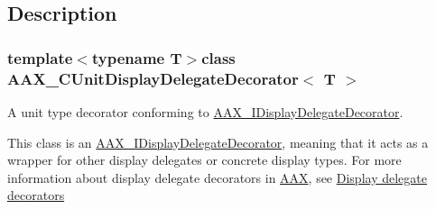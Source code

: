 \subsection{Description}
\subsubsection*{template$<$typename T$>$class A\+A\+X\+\_\+\+C\+Unit\+Display\+Delegate\+Decorator$<$ T $>$}

A unit type decorator conforming to \hyperlink{a00094}{A\+A\+X\+\_\+\+I\+Display\+Delegate\+Decorator}. 

This class is an \hyperlink{a00094}{A\+A\+X\+\_\+\+I\+Display\+Delegate\+Decorator}, meaning that it acts as a wrapper for other display delegates or concrete display types. For more information about display delegate decorators in \hyperlink{a00288}{A\+A\+X}, see \hyperlink{a00346_displaydelegates_decorators}{Display delegate decorators}

